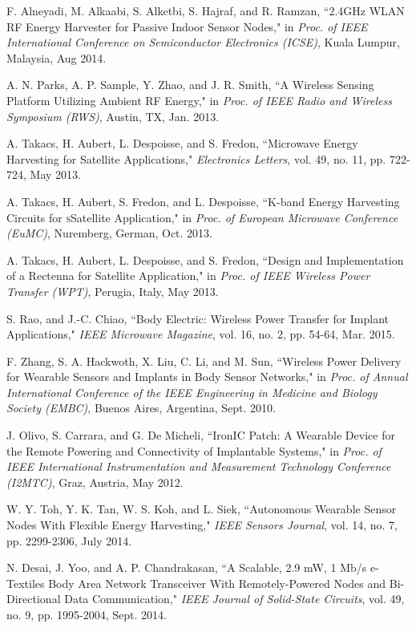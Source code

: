 \documentclass[twocolumn,10pt]{IEEEtran}
\begin{document}
\begin{thebibliography}{99}
F. Alneyadi, M. Alkaabi, S. Alketbi, S. Hajraf, and R. Ramzan, ``2.4GHz WLAN RF Energy Harvester for Passive Indoor Sensor Nodes," in \emph{Proc. of IEEE International Conference on Semiconductor Electronics (ICSE)}, Kuala Lumpur, Malaysia, Aug 2014.

A. N. Parks, A. P. Sample, Y. Zhao, and J. R. Smith,  
``A Wireless Sensing Platform Utilizing Ambient RF Energy,"
in \emph{Proc. of IEEE Radio and Wireless Symposium (RWS)}, Austin, TX, Jan. 2013.  
 
A. Takacs, H. Aubert, L. Despoisse, and S. Fredon, ``Microwave Energy Harvesting for Satellite Applications," \emph{Electronics Letters}, vol. 49, no. 11, pp. 722-724, May 2013.
 
A. Takacs, H. Aubert, S. Fredon, and L. Despoisse,  
``K-band Energy Harvesting Circuits for \textsc{sS}atellite Application," 
in \emph{Proc. of European Microwave Conference (EuMC)}, Nuremberg, German, Oct. 2013.

A. Takacs, H. Aubert, L. Despoisse, and S. Fredon,  
``Design and Implementation of a Rectenna for Satellite Application,"
in \emph{Proc. of IEEE Wireless Power Transfer (WPT)}, Perugia, Italy, May 2013.

S. Rao, and J.-C. Chiao,
``Body Electric: Wireless Power Transfer for Implant Applications,"  \emph{IEEE  Microwave Magazine}, vol. 16, no. 2,	pp. 54-64, Mar. 2015.



F. Zhang, S. A. Hackwoth, X. Liu, C. Li, and M. Sun, ``Wireless Power Delivery for Wearable Sensors and Implants in Body Sensor Networks," in \emph{Proc. of Annual International Conference of the IEEE Engineering in Medicine and Biology Society (EMBC)}, Buenos Aires, Argentina, Sept. 2010.

J. Olivo, S. Carrara, and G. De Micheli, ``IronIC Patch: A Wearable Device for the Remote Powering and Connectivity of Implantable Systems,"
in \emph{Proc. of IEEE International Instrumentation and Measurement Technology Conference (I2MTC)}, Graz, Austria, May 2012.

W. Y. Toh, Y. K. Tan, W. S. Koh, and L. Siek,  
``Autonomous Wearable Sensor Nodes With Flexible Energy Harvesting," \emph{IEEE Sensors Journal}, vol. 14, no. 7, pp. 2299-2306,	July 2014.

N. Desai, J. Yoo, and A. P. Chandrakasan, ``A Scalable, 2.9 mW, 1 Mb/s e-Textiles Body Area Network Transceiver With Remotely-Powered Nodes and Bi-Directional Data Communication," \emph{IEEE Journal of Solid-State Circuits},  vol. 49, no. 9, pp. 1995-2004, Sept. 2014. 


\end{thebibliography}
\end{document}
